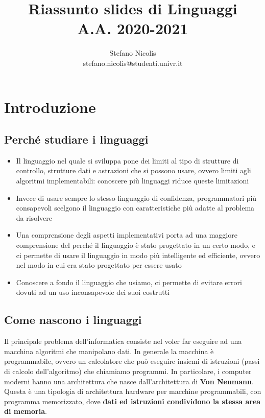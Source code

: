 \documentclass[12pt,a4paper]{article}
\begin{document}
\title{\textbf{Riassunto slides di Linguaggi}  \\  \large A.A. 2020-2021}
\author{Stefano Nicolis \\ stefano.nicolis@studenti.univr.it}

\maketitle

\clearpage

\tableofcontents

\clearpage

\section{Introduzione} \label{Introduzione}
\subsection{Perché studiare i linguaggi}
\begin{itemize}
\item Il linguaggio nel quale si sviluppa pone dei limiti al tipo di strutture di controllo, strutture dati e astrazioni che si possono usare, ovvero limiti agli algoritmi implementabili: conoscere più linguaggi riduce queste limitazioni
\item Invece di usare sempre lo stesso linguaggio di confidenza, programmatori più consapevoli scelgono il linguaggio con caratteristiche più adatte al problema da risolvere
\item Una comprensione degli aspetti implementativi porta ad una maggiore
comprensione del perché il linguaggio è stato progettato in un certo modo, e ci permette di usare il linguaggio in modo più intelligente ed efficiente, ovvero nel modo in cui era stato progettato per essere usato
\item Conoscere a fondo il linguaggio che usiamo, ci permette di evitare errori dovuti ad un uso inconsapevole dei suoi costrutti
\end{itemize}
\subsection{Come nascono i linguaggi}
Il principale problema dell'informatica consiste nel voler far eseguire ad una macchina algoritmi che manipolano dati.
In generale la macchina è programmabile, ovvero un calcolatore che può eseguire
insiemi di istruzioni (passi di calcolo dell'algoritmo) che chiamiamo programmi.
In particolare, i computer moderni hanno una architettura che nasce dall'architettura di \textbf{Von Neumann}. Questa è una tipologia di architettura hardware per macchine programmabili, con programma memorizzato, dove \textbf{dati ed istruzioni condividono la stessa area di memoria}.
\end{document}
